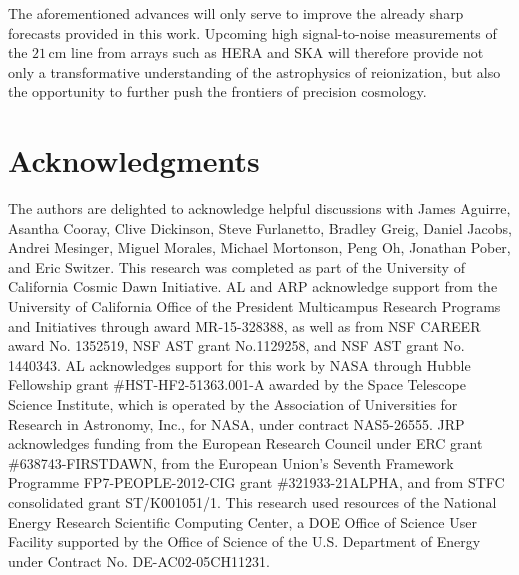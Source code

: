 \documentclass[twocolumn,aps,prd,nofootinbib,showpacs]{revtex4-1}
\begin{document}
The aforementioned advances will only serve to improve the already sharp forecasts provided in this work. Upcoming high signal-to-noise measurements of the $21\,\textrm{cm}$ line from arrays such as HERA and SKA will therefore provide not only a transformative understanding of the astrophysics of reionization, but also the opportunity to further push the frontiers of precision cosmology.

\section*{Acknowledgments}
The authors are delighted to acknowledge helpful discussions with James Aguirre, Asantha Cooray, Clive Dickinson, Steve Furlanetto, Bradley Greig, Daniel Jacobs, Andrei Mesinger, Miguel Morales, Michael Mortonson, Peng Oh, Jonathan Pober, and Eric Switzer. This research was completed as part of the University of California Cosmic Dawn Initiative. AL and ARP acknowledge support from the University of California Office of the President Multicampus Research Programs and Initiatives through award MR-15-328388, as well as from NSF CAREER award No. 1352519, NSF AST grant No.1129258, and NSF AST grant No. 1440343. AL acknowledges support for this work by NASA through Hubble Fellowship grant \#HST-HF2-51363.001-A awarded by the Space Telescope Science Institute, which is operated by the Association of Universities for Research in Astronomy, Inc., for NASA, under contract NAS5-26555. JRP acknowledges funding from the European Research Council under ERC grant \#638743-FIRSTDAWN, from the European Union's Seventh Framework Programme FP7-PEOPLE-2012-CIG grant \#321933-21ALPHA, and from STFC consolidated grant ST/K001051/1. This research used resources of the National Energy Research Scientific Computing Center, a DOE Office of Science User Facility supported by the Office of Science of the U.S. Department of Energy under Contract No. DE-AC02-05CH11231. 




\end{document}
